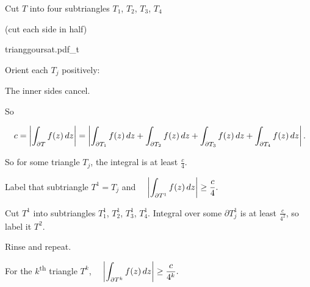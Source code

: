 \documentclass[10pt,aspectratio=169]{beamer}
\begin{document}
\begin{frame}
Cut $T$ into four subtriangles $T_1$, $T_2$, $T_3$, $T_4$

(cut each side in half)

\vspace*{-0.5in}
\hspace*{2.5in}
{trianggoursat.pdf_t}

\vspace*{-0.7in}
\pause

Orient each $T_j$ positively:

\medskip

The inner sides cancel.

\medskip
\pause

So

\medskip

$\displaystyle
\quad
c = 
\left\lvert {\int_{\partial T} f(z) \, dz } \right\rvert
=
\left\lvert {\int_{\partial T_1} f(z) \, dz 
+
\int_{\partial T_2} f(z) \, dz 
+
\int_{\partial T_3} f(z) \, dz 
+
\int_{\partial T_4} f(z) \, dz } \right\rvert . $

\medskip
\pause

So for some triangle $T_j$, the integral is at least $\frac{c}{4}$.

\medskip
\pause

Label that subtriangle $T^1 = T_j$ and
$\displaystyle
\quad
\left\lvert {\int_{\partial T^1} f(z) \, dz } \right\rvert \geq \frac{c}{4} .$

\medskip
\pause

Cut $T^1$ into subtriangles $T_1^1$, $T_2^1$, $T_3^1$, $T_4^1$.
\pause
Integral over some $\partial T_j^1$ is at least $\frac{c}{4^2}$, so label it $T^2$.

\pause

Rinse and repeat.

\pause
\medskip

For the $k$\textsuperscript{th} triangle $T^k$,
$\displaystyle
\quad
\left\lvert {\int_{\partial T^k} f(z) \, dz } \right\rvert \geq \frac{c}{4^k}.$
\end{frame}
\end{document}
